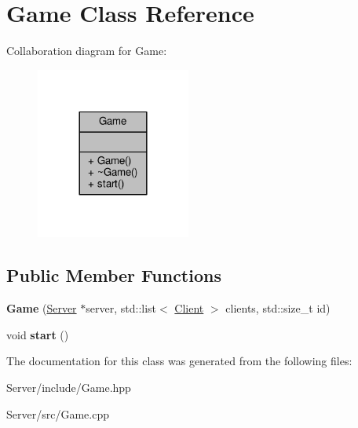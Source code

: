 \hypertarget{class_game}{}\section{Game Class Reference}
\label{class_game}


Collaboration diagram for Game\+:\nopagebreak
\begin{figure}[H]
\begin{center}
\leavevmode
\includegraphics[width=144pt]{df/db2/class_game__coll__graph}
\end{center}
\end{figure}
\subsection*{Public Member Functions}
\begin{DoxyCompactItemize}
\item 
{\bfseries Game} (\hyperlink{class_server}{Server} $\ast$server, std\+::list$<$ \hyperlink{class_client}{Client} $>$ clients, std\+::size\+\_\+t id)\hypertarget{class_game_afff741a8d7d1bb6ae93b7f095db0e842}{}\label{class_game_afff741a8d7d1bb6ae93b7f095db0e842}

\item 
void {\bfseries start} ()\hypertarget{class_game_a3d9b98f7c4a96ecf578f75b96c9f0e90}{}\label{class_game_a3d9b98f7c4a96ecf578f75b96c9f0e90}

\end{DoxyCompactItemize}


The documentation for this class was generated from the following files\+:\begin{DoxyCompactItemize}
\item 
Server/include/Game.\+hpp\item 
Server/src/Game.\+cpp\end{DoxyCompactItemize}

